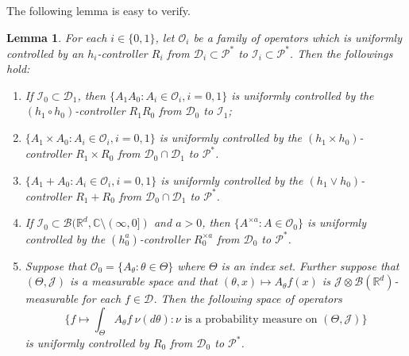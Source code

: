 \documentclass[12pt,a4paper]{amsart}
\theoremstyle{plain}
\newtheorem{lem}[thm]{Lemma}
\theoremstyle{definition}
\numberwithin{equation}{section}
\begin{document}
The following lemma is easy to verify.
\begin{lem}
  \label{lem: property of controllable operators}
  For each $i \in \{0,1\}$, let $\mathscr O_i$ be a family of operators which is  uniformly controlled by an $h_i$-controller $R_i$ from $\mathcal D_i \subset \mathcal P^*$ to $ \mathcal I_i \subset \mathcal P^*$. 
  Then the followings hold: 
  \begin{enumerate}
  \item 
    If $\mathcal I_0 \subset \mathcal D_1$, then $\{A_1A_0: A_i \in \mathscr O_i, i = 0,1\}$ is uniformly controlled by the $(h_1 \circ h_0)$-controller $R_1R_0$ from $\mathcal D_0$ to $\mathcal I_1$;
  \item
    $\{ A_1 \times A_0: A_i \in \mathscr O_i, i = 0,1\}$ is uniformly controlled by the $(h_1\times h_0)$-controller $R_1 \times R_0$ from $\mathcal D_0 \cap \mathcal D_1$ to $\mathcal P^*$.
  \item
    $\{ A_1 + A_0: A_i \in \mathscr O_i, i = 0,1\}$ is uniformly controlled by the $(h_1 \vee h_0)$-controller $R_1 + R_0$ from $\mathcal D_0 \cap \mathcal D_1$ to $\mathcal P^*$. 
\item 
    If $\mathcal I_0 \subset \mathcal B(\mathbb R^d, \mathbb C \setminus (\infty, 0])$ and $a>0$, then $\{A^{\times a} : A \in \mathscr O_0\}$ is uniformly controlled by the $(h_0^a)$-controller $R_0^{\times a}$ from $\mathcal D_0$ to $\mathcal P^*$.
  \item
    Suppose that $\mathcal O_0 = \{A_\theta: \theta \in \Theta \}$ where $\Theta$ is an index set. 
    Further suppose that $(\Theta, \mathcal J )$ is a measurable space and that $(\theta,x) \mapsto A_\theta f(x)$ is $\mathcal J \otimes \mathcal B(\mathbb R^d)$-measurable for each $f\in \mathcal D$.
    Then the following space of operators
    \[
      \Big\{ f \mapsto \int_{\Theta} A_\theta f~\nu(d\theta) : \nu \text{ is a probability measure on } (\Theta, \mathcal J) \Big\}
    \] 
    is uniformly controlled by $R_0$ from $\mathcal D_0$ to $\mathcal P^*$.
\end{enumerate}  
\end{lem}
\end{document}

